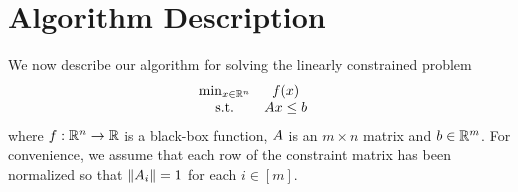 \documentclass{article}
\begin{document}
%
%







\section{Algorithm Description}
\label{sec:linear}
We now describe our algorithm for solving the linearly constrained problem
\begin{align}
\label{eq:DFO-linear}
\begin{array}{ccl} \min_{x \in \mathbb R^n} & f(x) \\
\textrm{s.t.} & {A} x \le {b} & 
\end{array}
\end{align}
where $f:\mathbb R^n\rightarrow\mathbb R$ is a black-box function, 
${A}$ is an $m \times n$ matrix and ${b} \in \mathbb R^m$.
For convenience, we assume that each row of the constraint matrix has been normalized so that $\left\|{A}_i\right\| = 1$ for each $i \in [m]$.  
\end{document}
